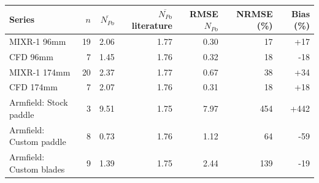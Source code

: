 \begin{tabular}{@{}lrrrrrr@{}}
\toprule
Series & $n$ & $\overline{N_{Po}}$ & $\overline{N_{Po}}$ literature & RMSE $N_{Po}$ & NRMSE (\%) & Bias (\%) \\
\midrule
MIXR-1 96mm & 19 & 2.06 & 1.77 & 0.30 & 17 & +17 \\
CFD 96mm & 7 & 1.45 & 1.76 & 0.32 & 18 & -18 \\
MIXR-1 174mm & 20 & 2.37 & 1.77 & 0.67 & 38 & +34 \\
CFD 174mm & 7 & 2.07 & 1.76 & 0.31 & 18 & +18 \\
Armfield: Stock paddle & 3 & 9.51 & 1.75 & 7.97 & 454 & +442 \\
Armfield: Custom paddle & 8 & 0.73 & 1.76 & 1.12 & 64 & -59 \\
Armfield: Custom blades & 9 & 1.39 & 1.75 & 2.44 & 139 & -19 \\
\bottomrule
\end{tabular}
